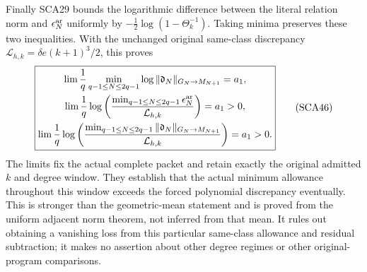 Finally SCA29 bounds the logarithmic difference between the literal
relation norm and $\epsilon_N^{\rm ar}$ uniformly by
$-\tfrac12\log(1-\Theta_k^{-1})$. Taking minima preserves these
two inequalities. With the unchanged original same-class discrepancy
$\mathcal L_{h,k}=\delta e(k+1)^3/2$, this proves
\[
 \boxed{\begin{gathered}
 \lim\frac1q\min_{q-1\le N\le2q-1}
                   \log\|\mathfrak d_N\|_{G_N\to M_{N+1}}=a_1,\\
 \lim\frac1q\log\left(
    \frac{\min_{q-1\le N\le2q-1}\epsilon_N^{\rm ar}}
         {\mathcal L_{h,k}}\right)=a_1>0,\\
 \lim\frac1q\log\left(
    \frac{\min_{q-1\le N\le2q-1}
                    \|\mathfrak d_N\|_{G_N\to M_{N+1}}}
         {\mathcal L_{h,k}}\right)=a_1>0.
 \end{gathered}}\tag{SCA46}
\]
The limits fix the actual complete packet and retain exactly the original
admitted $k$ and degree window. They establish that the actual minimum
allowance throughout this window exceeds the forced polynomial discrepancy
eventually. This is stronger than the geometric-mean statement and is
proved from the uniform adjacent norm theorem, not inferred from that
mean. It rules out obtaining a vanishing loss from this particular
same-class allowance and residual subtraction; it makes no assertion
about other degree regimes or other original-program comparisons.
